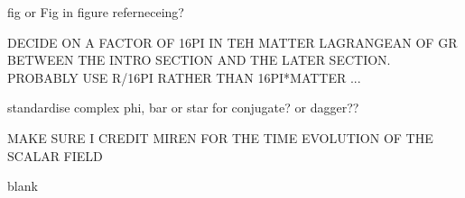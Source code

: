 \documentclass[11pt]{report}  %
\numberwithin{equation}{section}
\begin{document}
fig or Fig in figure referneceing?

DECIDE ON A FACTOR OF 16PI IN TEH MATTER LAGRANGEAN OF GR BETWEEN THE INTRO SECTION AND THE LATER SECTION. PROBABLY USE R/16PI RATHER THAN 16PI*MATTER ... 

standardise complex phi, bar or star for conjugate? or dagger??

MAKE SURE I CREDIT MIREN FOR THE TIME EVOLUTION OF THE SCALAR FIELD



\begin{thebibliography}{9}

%
%


blank
  \end{thebibliography}



  
\end{document}
